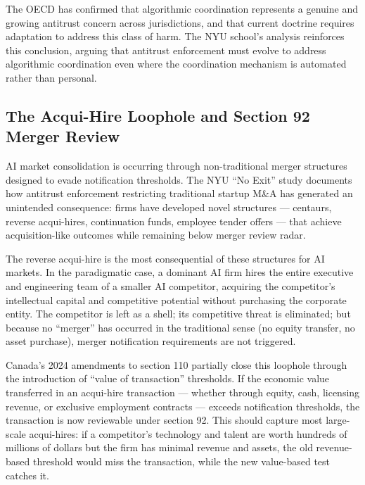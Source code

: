 The OECD has confirmed that algorithmic coordination represents a genuine and growing antitrust concern across jurisdictions, and that current doctrine requires adaptation to address this class of harm. The NYU school's analysis reinforces this conclusion, arguing that antitrust enforcement must evolve to address algorithmic coordination even where the coordination mechanism is automated rather than personal.

\subsection{The Acqui-Hire Loophole and Section 92 Merger Review}

AI market consolidation is occurring through non-traditional merger structures designed to evade notification thresholds. The NYU ``No Exit'' study documents how antitrust enforcement restricting traditional startup M\&A has generated an unintended consequence: firms have developed novel structures --- centaurs, reverse acqui-hires, continuation funds, employee tender offers --- that achieve acquisition-like outcomes while remaining below merger review radar.

The reverse acqui-hire is the most consequential of these structures for AI markets. In the paradigmatic case, a dominant AI firm hires the entire executive and engineering team of a smaller AI competitor, acquiring the competitor's intellectual capital and competitive potential without purchasing the corporate entity. The competitor is left as a shell; its competitive threat is eliminated; but because no ``merger'' has occurred in the traditional sense (no equity transfer, no asset purchase), merger notification requirements are not triggered.

Canada's 2024 amendments to section 110 partially close this loophole through the introduction of ``value of transaction'' thresholds. If the economic value transferred in an acqui-hire transaction --- whether through equity, cash, licensing revenue, or exclusive employment contracts --- exceeds notification thresholds, the transaction is now reviewable under section 92. This should capture most large-scale acqui-hires: if a competitor's technology and talent are worth hundreds of millions of dollars but the firm has minimal revenue and assets, the old revenue-based threshold would miss the transaction, while the new value-based test catches it.

